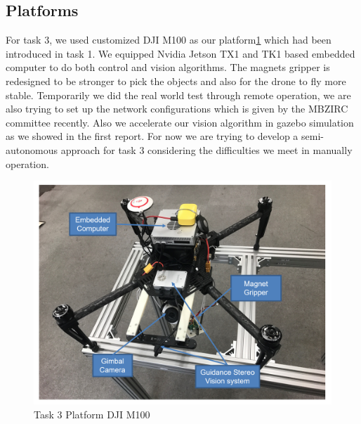 \documentclass{standalone}
\begin{document}
\subsection{Platforms}
For task 3, we used customized DJI M100 as our platform\ref{task3platform} which had been introduced in task 1. We equipped Nvidia Jetson TX1 and TK1 based embedded computer to do both control and vision algorithms. The magnets gripper is redesigned to be stronger to pick the objects and also for the drone to fly more stable. Temporarily we did the real world test through remote operation, we are also trying to set up the network configurations which is given by the MBZIRC committee recently. Also we accelerate our vision algorithm in gazebo simulation as we showed in the first report. For now we are trying to develop a semi-autonomous approach for task 3 considering the difficulties we meet in manually operation.
 \begin{figure}%
    \begin{center}
    \includegraphics[keepaspectratio=true, width=1\linewidth, height=0.3\textheight]
    {sections//task3//images//task3platform.png}
      \end{center}
    \caption{Task 3 Platform DJI M100}
    \label{task3platform}
    \end{figure}
    
\end{document}
